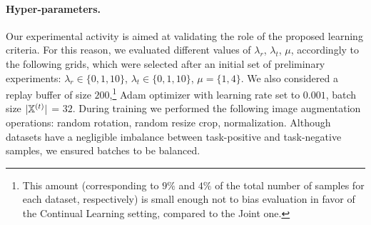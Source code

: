 \paragraph{Hyper-parameters.} Our experimental activity is aimed at validating the role of the proposed learning criteria. For this reason, we evaluated different values of $\lambda_r$, $\lambda_t$, $\mu$, accordingly to the following grids, which were selected after an initial set of preliminary experiments: $\lambda_r \in \{ 0, 1, 10 \}$, $\lambda_t \in \{ 0, 1, 10 \}$, $\mu = \{ 1, 4 \}$. We also considered a replay buffer of size $200$,\footnote{This amount (corresponding to $9\%$ and $4\%$ of the total number of samples for each dataset, respectively) is small enough not to bias evaluation in favor of the Continual Learning setting, compared to the Joint one.} Adam optimizer with learning rate set to $0.001$, batch size $|{\mathbb{X}}^{(t)}|$ = $32$.
During training we performed the following image augmentation operations: random rotation, random resize crop, normalization. %
Although datasets have a negligible imbalance between task-positive and task-negative samples, we ensured batches to be balanced. %

